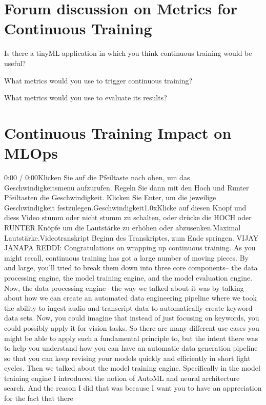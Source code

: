 {{{{\section{Forum discussion on Metrics for Continuous Training}

Is there a tinyML application in which you think continuous training would be useful?

 What metrics would you use to trigger continuous training?
 
  What metrics would you use to evaluate its results? 
  
  
\section{Continuous Training Impact on MLOps}

    0:00 / 0:00Klicken Sie auf die Pfeiltaste nach oben, um das Geschwindigkeitsmenu aufzurufen. Regeln Sie dann mit den Hoch und Runter Pfeiltasten die Geschwindigkeit. Klicken Sie Enter, um die jeweilige Geschwindigkeit festzulegen.Geschwindigkeit1.0xKlicke auf diesen Knopf und diess Video stumm oder nicht stumm zu schalten, oder drücke die HOCH oder RUNTER Knöpfe um die Lautstärke zu erhöhen oder abzusenken.Maximal Lautstärke.Videotranskript
    Beginn des Transkriptes, zum Ende springen.
    VIJAY JANAPA REDDI: Congratulations on wrapping up continuous training.
    As you might recall, continuous training has
    got a large number of moving pieces.
    By and large, you'll tried to break them down into three core components--
    the data processing engine, the model training engine,
    and the model evaluation engine.
    Now, the data processing engine-- the way
    we talked about it was by talking about how we can create an automated data
    engineering pipeline where we took the ability to ingest audio and transcript
    data to automatically create keyword data sets.
    Now, you could imagine that instead of just focusing on keywords,
    you could possibly apply it for vision tasks.
    So there are many different use cases you
    might be able to apply such a fundamental principle to,
    but the intent there was to help you understand
    how you can have an automatic data generation pipeline so that you
    can keep revising your models quickly and efficiently in short light cycles.
    Then we talked about the model training engine.
    Specifically in the model training engine
    I introduced the notion of AutoML and neural architecture search.
    And the reason I did that was because I want
    you to have an appreciation for the fact that there
}}}}
